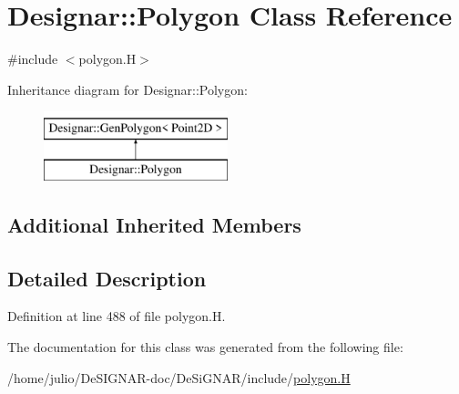 \hypertarget{class_designar_1_1_polygon}{}\section{Designar\+:\+:Polygon Class Reference}
\label{class_designar_1_1_polygon}


{\ttfamily \#include $<$polygon.\+H$>$}

Inheritance diagram for Designar\+:\+:Polygon\+:\begin{figure}[H]
\begin{center}
\leavevmode
\includegraphics[height=2.000000cm]{class_designar_1_1_polygon}
\end{center}
\end{figure}
\subsection*{Additional Inherited Members}


\subsection{Detailed Description}


Definition at line 488 of file polygon.\+H.



The documentation for this class was generated from the following file\+:\begin{DoxyCompactItemize}
\item 
/home/julio/\+De\+S\+I\+G\+N\+A\+R-\/doc/\+De\+Si\+G\+N\+A\+R/include/\hyperlink{polygon_8_h}{polygon.\+H}\end{DoxyCompactItemize}
